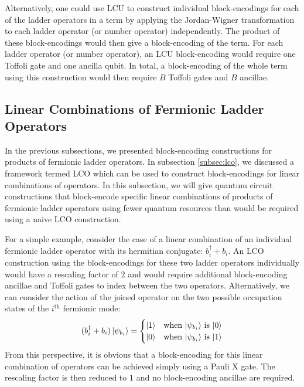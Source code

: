 Alternatively, one could use LCU to construct individual block-encodings for each of the ladder operators in a term by applying the Jordan-Wigner transformation to each ladder operator (or number operator) independently.
The product of these block-encodings would then give a block-encoding of the term.
For each ladder operator (or number operator), an LCU block-encoding would require one Toffoli gate and one ancilla qubit.
In total, a block-encoding of the whole term using this construction would then require $B$ Toffoli gates and $B$ ancillae. 


\subsection{Linear Combinations of Fermionic Ladder Operators}

In the previous subsections, we presented block-encoding constructions for products of fermionic ladder operators.
In subsection \ref{subsec:lco}, we discussed a framework termed LCO which can be used to construct block-encodings for linear combinations of operators.
In this subsection, we will give quantum circuit constructions that block-encode specific linear combinations of products of fermionic ladder operators using fewer quantum resources than would be required using a naive LCO construction.

For a simple example, consider the case of a linear combination of an individual fermionic ladder operator with its hermitian conjugate: $b_i^\dagger + b_i$.
An LCO construction using the block-encodings for these two ladder operators individually would have a rescaling factor of $2$ and would require additional block-encoding ancillae and Toffoli gates to index between the two operators.
Alternatively, we can consider the action of the joined operator on the two possible occupation states of the $i^\text{th}$ fermionic mode:
\begin{equation}
    \begin{split}
        (b_i^\dagger + b_i) \ket{\psi_{b_i}} = \begin{cases} 
            \ket{1} & \text{when $\ket{\psi_{b_i}}$ is $\ket{0}$} \\
            \ket{0} & \text{when $\ket{\psi_{b_i}}$ is $\ket{1}$} \\
                                        \end{cases}
    \end{split}
\end{equation}
From this perspective, it is obvious that a block-encoding for this linear combination of operators can be achieved simply using a Pauli X gate.
The rescaling factor is then reduced to $1$ and no block-encoding ancillae are required.

